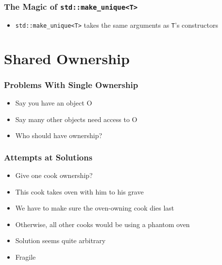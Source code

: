 \begin{frame}
  \frametitle{The Magic of {\tt std::make\_unique<T>}}
  \begin{itemize}
    \item {\tt std::make\_unique<T>} takes the same arguments as {\tt T}'s constructors
  \end{itemize}
\end{frame}

\section{Shared Ownership}
\frame{\tableofcontents[currentsection]}


\begin{frame}
  \frametitle{Problems With Single Ownership}
  \begin{itemize}
    \item Say you have an object O
    \item Say many other objects need access to O
    \item Who should have ownership?
  \end{itemize}
  \begin{center}
  \end{center}
\end{frame}

\begin{frame}
  \frametitle{Attempts at Solutions}
  \begin{itemize}
    \item Give one cook ownership?
    \item This cook takes oven with him to his grave
    \item We have to make sure the oven-owning cook dies last
    \item Otherwise, all other cooks would be using a phantom oven
  \end{itemize}
  \vskip5mm
  \begin{itemize}
    \item Solution seems quite arbitrary
    \item Fragile
  \end{itemize}
\end{frame}

